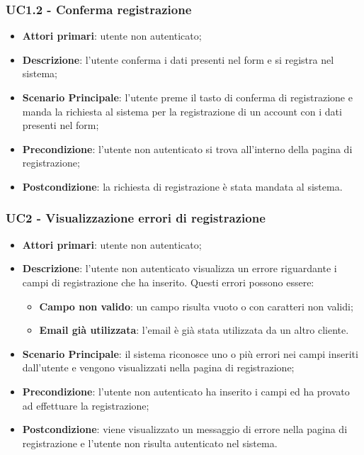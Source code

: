 \subsubsection{UC1.2 - Conferma registrazione}
\begin{itemize}
\item \textbf{Attori primari}: utente non autenticato;
\item \textbf{Descrizione}: l'utente conferma i dati presenti nel form e si registra nel sistema;
\item \textbf{Scenario Principale}: l'utente preme il tasto di conferma di registrazione e manda la richiesta al sistema per la registrazione di un account con i dati presenti nel form;
\item \textbf{Precondizione}: l'utente non autenticato si trova all'interno della pagina di registrazione;
\item \textbf{Postcondizione}: la richiesta di registrazione è stata mandata al sistema.
\end{itemize}

\subsubsection{UC2 - Visualizzazione errori di registrazione}
\begin{itemize}
\item \textbf{Attori primari}: utente non autenticato;
\item \textbf{Descrizione}: l'utente non autenticato visualizza un errore riguardante i campi di registrazione che ha inserito. Questi errori possono essere:
\begin{itemize}
\item \textbf{Campo non valido}: un campo risulta vuoto o con caratteri non validi;
\item \textbf{Email già utilizzata}: l'email è già stata utilizzata da un altro cliente.
\end{itemize}
\item \textbf{Scenario Principale}: il sistema riconosce uno o più errori nei campi inseriti dall'utente e vengono visualizzati nella pagina di registrazione;
\item \textbf{Precondizione}: l'utente non autenticato ha inserito i campi ed ha provato ad effettuare la registrazione;
\item \textbf{Postcondizione}: viene visualizzato un messaggio di errore nella pagina di registrazione e l'utente non risulta autenticato nel sistema.
\end{itemize}

